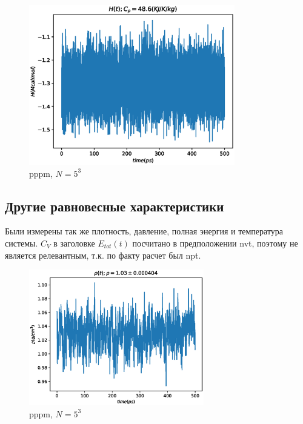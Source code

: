 \documentclass[a4paper,12pt]{article} %
\begin{document}
\begin{figure}[h!]
\begin{center}
\includegraphics[width=0.8\textwidth]{./pics/pppm_H_N5}
\end{center}
\caption{pppm, $N = 5^3$} \label{img:pppm_H_N5}
\end{figure}

\newpage

\subsection{Другие равновесные характеристики}

Были измерены так же плотность, давление, полная энергия и температура системы. $C_V$ в заголовке $E_{tot}(t)$ посчитано в предположении nvt, поэтому не является релевантным, т.к. по факту расчет был npt.

\begin{figure}[h!]
\begin{center}
\includegraphics[width=0.68\textwidth]{./pics/pppm_N5rho}
\end{center}
\caption{pppm, $N = 5^3$} \label{img:pppm_H_N5}
\end{figure}
\end{document}
